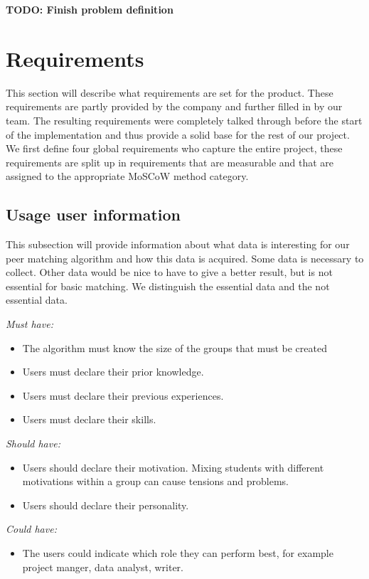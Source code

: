 \documentclass[]{article}
\newcommand{\TODO}[1]{{\color{red}\textbf{TODO: #1}}}
\newcommand{\reqr}[1]{{\noindent\emph{#1:}}}
\begin{document}
\TODO{Finish problem definition}

\section{Requirements}
This section will describe what requirements are set for the product.
These requirements are partly provided by the company and further filled in by our team.
The resulting requirements were completely talked through before the start of the implementation and thus provide a solid base for the rest of our project.
We first define four global requirements who capture the entire project, these requirements are split up in requirements that are measurable and that are assigned to the appropriate MoSCoW\cite{highsmith2001agile} method category.

\subsection{Usage user information}
This subsection will provide information about what data is interesting for our peer matching algorithm and how this data is acquired.
Some data is necessary to collect. 
Other data would be nice to have to give a better result, but is not essential for basic matching.
We distinguish the essential data and the not essential data.\cite{cmu}

\reqr{Must have}
\begin{itemize}
\item The algorithm must know the size of the groups that must be created
\item Users must declare their prior knowledge.
\item Users must declare their previous experiences.
\item Users must declare their skills.
\end{itemize}

\reqr{Should have}
\begin{itemize}
\item Users should declare their motivation. 
Mixing students with different motivations within a group can cause tensions and problems.
\item Users should declare their personality. 
\end{itemize}

\reqr{Could have}
\begin{itemize}
\item The users could indicate which role they can perform best, for example project manger, data analyst, writer. 
\end{itemize}
\end{document}
